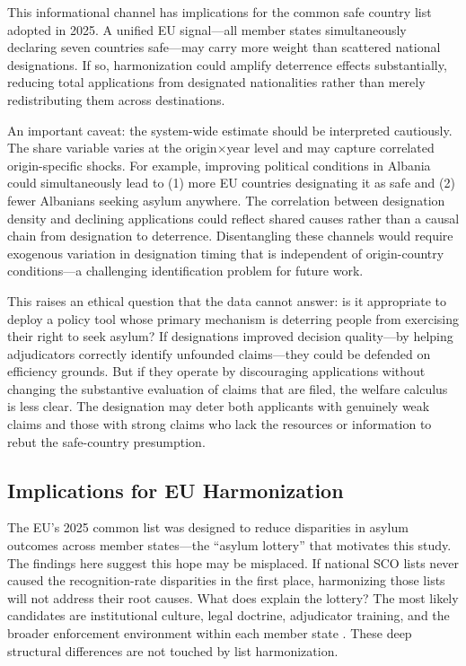 \documentclass[12pt]{article}
\begin{document}
This informational channel has implications for the common safe country list adopted in 2025. A unified EU signal---all member states simultaneously declaring seven countries safe---may carry more weight than scattered national designations. If so, harmonization could amplify deterrence effects substantially, reducing total applications from designated nationalities rather than merely redistributing them across destinations.

An important caveat: the system-wide estimate should be interpreted cautiously. The share variable varies at the origin$\times$year level and may capture correlated origin-specific shocks. For example, improving political conditions in Albania could simultaneously lead to (1) more EU countries designating it as safe and (2) fewer Albanians seeking asylum anywhere. The correlation between designation density and declining applications could reflect shared causes rather than a causal chain from designation to deterrence. Disentangling these channels would require exogenous variation in designation timing that is independent of origin-country conditions---a challenging identification problem for future work.

This raises an ethical question that the data cannot answer: is it appropriate to deploy a policy tool whose primary mechanism is deterring people from exercising their right to seek asylum? If designations improved decision quality---by helping adjudicators correctly identify unfounded claims---they could be defended on efficiency grounds. But if they operate by discouraging applications without changing the substantive evaluation of claims that are filed, the welfare calculus is less clear. The designation may deter both applicants with genuinely weak claims and those with strong claims who lack the resources or information to rebut the safe-country presumption.

\subsection{Implications for EU Harmonization}

The EU's 2025 common list was designed to reduce disparities in asylum outcomes across member states---the ``asylum lottery'' that motivates this study. The findings here suggest this hope may be misplaced. If national SCO lists never caused the recognition-rate disparities in the first place, harmonizing those lists will not address their root causes. What does explain the lottery? The most likely candidates are institutional culture, legal doctrine, adjudicator training, and the broader enforcement environment within each member state \citep{costello2016safe, toshkov2014asylum}. These deep structural differences are not touched by list harmonization.
\end{document}
